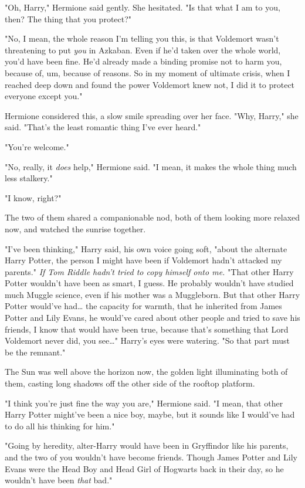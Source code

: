 "Oh, Harry," Hermione said gently. She hesitated. "Is that what I am to you,
then? The thing that you protect?"

"No, I mean, the whole reason I'm telling you this, is that Voldemort wasn't
threatening to put \emph{you} in Azkaban. Even if he'd taken over the whole
world, you'd have been fine. He'd already made a binding promise not to harm
you, because of, um, because of reasons. So in my moment of ultimate crisis,
when I reached deep down and found the power Voldemort knew not, I did it to
protect everyone except you."

Hermione considered this, a slow smile spreading over her face. "Why, Harry,"
she said. "That's the least romantic thing I've ever heard."

"You're welcome."

"No, really, it \emph{does} help," Hermione said. "I mean, it makes the whole
thing much less stalkery."

"I know, right?"

The two of them shared a companionable nod, both of them looking more relaxed
now, and watched the sunrise together.

"I've been thinking," Harry said, his own voice going soft, "about the
alternate Harry Potter, the person I might have been if Voldemort hadn't
attacked my parents." \emph{If Tom Riddle hadn't tried to copy himself onto
me.} "That other Harry Potter wouldn't have been as smart, I guess. He probably
wouldn't have studied much Muggle science, even if his mother was a Muggleborn.
But that other Harry Potter would've had{\ldots} the capacity for warmth, that
he inherited from James Potter and Lily Evans, he would've cared about other
people and tried to save his friends, I know that would have been true, because
that's something that Lord Voldemort never did, you see{\ldots}" Harry's eyes
were watering. "So that part must be the remnant."

The Sun was well above the horizon now, the golden light illuminating both of
them, casting long shadows off the other side of the rooftop platform.

"I think you're just fine the way you are," Hermione said. "I mean, that other
Harry Potter might've been a nice boy, maybe, but it sounds like I would've had
to do all his thinking for him."

"Going by heredity, alter-Harry would have been in Gryffindor like his parents,
and the two of you wouldn't have become friends. Though James Potter and Lily
Evans were the Head Boy and Head Girl of Hogwarts back in their day, so he
wouldn't have been \emph{that} bad."

